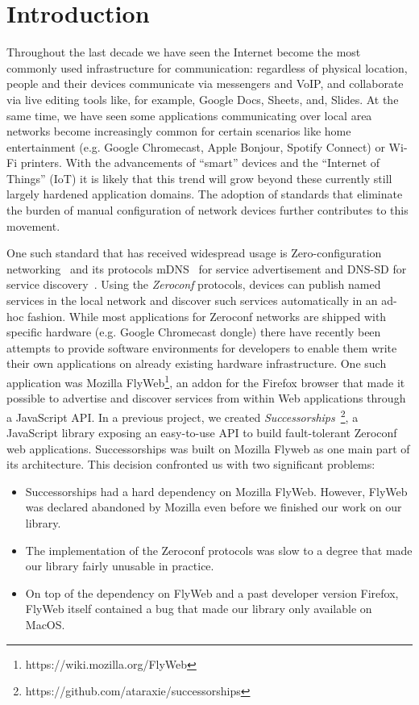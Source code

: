 \section{Introduction}
\label{sec:introduction}

Throughout the last decade we have seen the Internet become the most commonly used infrastructure for communication: regardless of physical location, people and their devices communicate via messengers and VoIP, and collaborate via live editing tools like, for example, Google Docs, Sheets, and, Slides. 
At the same time, we have seen some applications communicating over local area networks become increasingly common for certain scenarios like home entertainment (e.g. Google Chromecast, Apple Bonjour, Spotify Connect) or Wi-Fi printers. 
With the advancements of ``smart'' devices and the ``Internet of Things'' (IoT) it is likely that this trend will grow beyond these currently still largely hardened application domains.
The adoption of standards that eliminate the burden of manual configuration of network devices further contributes to this movement.

One such standard that has received widespread usage is Zero-configuration networking~\cite{guttman_2001} and its protocols mDNS~\cite{cheshire_2013_mdns} for service advertisement and DNS-SD for service discovery~\cite{cheshire_2013_dnssd}.
Using the \textit{Zeroconf} protocols, devices can publish named services in the local network and discover such services automatically in an ad-hoc fashion.
While most applications for Zeroconf networks are shipped with specific hardware (e.g. Google Chromecast dongle) there have recently been attempts to provide software environments for developers to enable them write their own applications on already existing hardware infrastructure.
One such application was Mozilla FlyWeb\footnote{https://wiki.mozilla.org/FlyWeb}, an addon for the Firefox browser that made it possible to advertise and discover services from within Web applications through a JavaScript API.
In a previous project, we created \textit{Successorships}~\footnote{https://github.com/ataraxie/successorships}, a JavaScript library exposing an easy-to-use API to build fault-tolerant Zeroconf web applications.
Successorships was built on Mozilla Flyweb as one main part of its architecture.
This decision confronted us with two significant problems:
\begin{itemize}
    \item Successorships had a hard dependency on Mozilla FlyWeb. However, FlyWeb was declared abandoned by Mozilla even before we finished our work on our library.
    \item The implementation of the Zeroconf protocols was slow to a degree that made our library fairly unusable in practice.
    \item On top of the dependency on FlyWeb and a past developer version Firefox, FlyWeb itself contained a bug that made our library only available on MacOS. 
\end{itemize}

